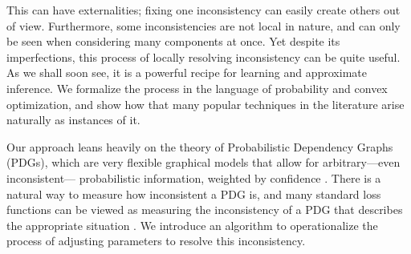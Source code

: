 This can have externalities; fixing one inconsistency can easily create
    others out of view.
Furthermore, some inconsistencies
    are not local in nature,
    and can only be seen when considering many components at once.
Yet despite its imperfections,
    this process of locally resolving inconsistency  can be quite useful.
    As we shall soon see,
    it is a powerful recipe for learning and approximate inference.
%
We formalize the process
    in the language of probability and
    convex optimization,
    and show how that many popular techniques in the literature
    arise naturally as instances of it.



Our approach leans heavily on the theory of
Probabilistic Dependency Graphs (PDGs), which are very flexible graphical
    models that allow for arbitrary---even inconsistent---%
    probabilistic information, weighted by confidence \cite{pdg-aaai}.
There is a natural way
    to measure how inconsistent a PDG is,
    and many standard loss functions
    can be viewed as measuring the inconsistency of a PDG that
    describes the appropriate situation \cite{one-true-loss}.
%
%
We introduce an algorithm
    to operationalize
    the process of adjusting parameters
    to resolve this inconsistency.

